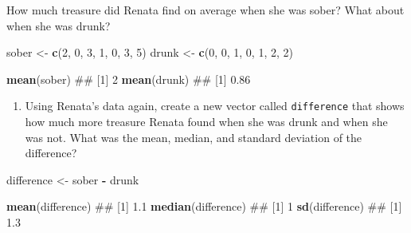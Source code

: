 \documentclass[]{book}
\newenvironment{Shaded}{\begin{snugshade}}{\end{snugshade}}
\newcommand{\KeywordTok}[1]{\textcolor[rgb]{0.13,0.29,0.53}{\textbf{#1}}}
\newcommand{\DecValTok}[1]{\textcolor[rgb]{0.00,0.00,0.81}{#1}}
\newcommand{\StringTok}[1]{\textcolor[rgb]{0.31,0.60,0.02}{#1}}
\newcommand{\OperatorTok}[1]{\textcolor[rgb]{0.81,0.36,0.00}{\textbf{#1}}}
\newcommand{\NormalTok}[1]{#1}
\providecommand{\tightlist}{%
  \setlength{\itemsep}{0pt}\setlength{\parskip}{0pt}}
\theoremstyle{definition}
\theoremstyle{definition}
\theoremstyle{remark}
\begin{document}
How much treasure did Renata find on average when she was sober? What
about when she was drunk?

\begin{Shaded}
\begin{Highlighting}[]
\NormalTok{sober <-}\StringTok{ }\KeywordTok{c}\NormalTok{(}\DecValTok{2}\NormalTok{, }\DecValTok{0}\NormalTok{, }\DecValTok{3}\NormalTok{, }\DecValTok{1}\NormalTok{, }\DecValTok{0}\NormalTok{, }\DecValTok{3}\NormalTok{, }\DecValTok{5}\NormalTok{)}
\NormalTok{drunk <-}\StringTok{ }\KeywordTok{c}\NormalTok{(}\DecValTok{0}\NormalTok{, }\DecValTok{0}\NormalTok{, }\DecValTok{1}\NormalTok{, }\DecValTok{0}\NormalTok{, }\DecValTok{1}\NormalTok{, }\DecValTok{2}\NormalTok{, }\DecValTok{2}\NormalTok{)}

\KeywordTok{mean}\NormalTok{(sober)}
\NormalTok{## [1] 2}
\KeywordTok{mean}\NormalTok{(drunk)}
\NormalTok{## [1] 0.86}
\end{Highlighting}
\end{Shaded}

\begin{enumerate}
\def\labelenumi{\arabic{enumi}.}
\setcounter{enumi}{2}
\tightlist
\item
  Using Renata's data again, create a new vector called
  \texttt{difference} that shows how much more treasure Renata found
  when she was drunk and when she was not. What was the mean, median,
  and standard deviation of the difference?
\end{enumerate}

\begin{Shaded}
\begin{Highlighting}[]
\NormalTok{difference <-}\StringTok{ }\NormalTok{sober }\OperatorTok{-}\StringTok{ }\NormalTok{drunk}

\KeywordTok{mean}\NormalTok{(difference)}
\NormalTok{## [1] 1.1}
\KeywordTok{median}\NormalTok{(difference)}
\NormalTok{## [1] 1}
\KeywordTok{sd}\NormalTok{(difference)}
\NormalTok{## [1] 1.3}
\end{Highlighting}
\end{Shaded}
\end{document}
